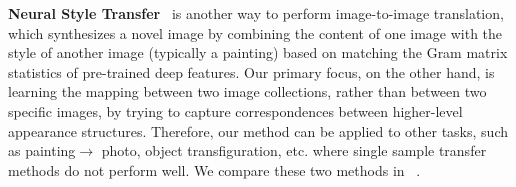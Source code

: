 {\bf Neural Style Transfer}~\cite{gatys2015neural,johnson2016perceptual,ulyanov2016texture,gatys2016preserving} is another way to perform image-to-image translation, which synthesizes a novel image by combining the content of one image with the style of another image (typically a painting) based on matching the Gram matrix statistics of pre-trained deep features.  Our primary focus, on the other hand, is learning the mapping between two image collections, rather than between two specific images, by trying to capture correspondences between higher-level appearance structures. Therefore, our method can be applied to other tasks, such as painting$\rightarrow$ photo, object transfiguration, etc. where single sample transfer methods do not perform well. We compare these two methods in ~.
